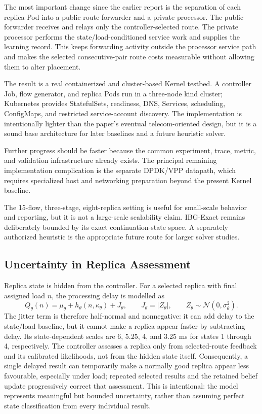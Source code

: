 \documentclass[12pt,a4paper]{article}
\begin{document}
The most important change since the earlier report is the separation of each replica Pod into a public route forwarder and a private processor. The public forwarder receives and relays only the controller-selected route. The private processor performs the state/load-conditioned service work and supplies the learning record. This keeps forwarding activity outside the processor service path and makes the selected consecutive-pair route costs measurable without allowing them to alter placement.

The result is a real containerized and cluster-based Kernel testbed. A controller Job, flow generator, and replica Pods run in a three-node kind cluster; Kubernetes provides StatefulSets, readiness, DNS, Services, scheduling, ConfigMaps, and restricted service-account discovery. The implementation is intentionally lighter than the paper's eventual telecom-oriented design, but it is a sound base architecture for later baselines and a future heuristic solver.

Further progress should be faster because the common experiment, trace, metric, and validation infrastructure already exists. The principal remaining implementation complication is the separate DPDK/VPP datapath, which requires specialized host and networking preparation beyond the present Kernel baseline.

\begin{tcolorbox}[
  colback=white,
  colframe=red!75!black,
  boxrule=1.2pt,
  arc=3mm,
  left=4mm,
  right=4mm,
  top=3mm,
  bottom=3mm
]
The 15-flow, three-stage, eight-replica setting is useful for small-scale behavior and reporting, but it is not a large-scale scalability claim. IBG-Exact remains deliberately bounded by its exact continuation-state space. A separately authorized heuristic is the appropriate future route for larger solver studies.
\end{tcolorbox}

\subsection{Uncertainty in Replica Assessment}
Replica state is hidden from the controller. For a selected replica with final assigned load $n$, the processing delay is modelled as
\[
Q_\theta(n)=\mu_\theta+h_\theta(n,\kappa_\theta)+J_\theta,
\qquad
J_\theta=|Z_\theta|,
\qquad
Z_\theta\sim\mathcal{N}(0,\sigma_\theta^2).
\]
The jitter term is therefore half-normal and nonnegative: it can add delay to the state/load baseline, but it cannot make a replica appear faster by subtracting delay. Its state-dependent scales are 6, 5.25, 4, and 3.25 ms for states 1 through 4, respectively. The controller assesses a replica only from selected-route feedback and its calibrated likelihoods, not from the hidden state itself. Consequently, a single delayed result can temporarily make a normally good replica appear less favourable, especially under load; repeated selected results and the retained belief update progressively correct that assessment. This is intentional: the model represents meaningful but bounded uncertainty, rather than assuming perfect state classification from every individual result.
\end{document}
